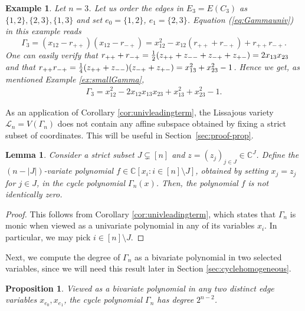 \documentclass[a4paper, 11pt, twoside]{article}
\newcommand{\C}{\mathbb{C}}
\newcommand{\ML}{{\mathcal L}}
\theoremstyle{plain}
\newtheorem{lemma}[theorem]{Lemma}
\newtheorem{proposition}[theorem]{Proposition}
\newtheorem{example}[theorem]{Example}
\begin{document}
\begin{example}\label{ex:Gamma3}
Let $n = 3$. Let us order the edges in $E_3=E(C_3)$ as $\{1,2\},\{2,3\},\{1,3\}$ and set $e_0=\{1,2\}$, $e_1=\{2,3\}$.
Equation (\ref{eq:Gammauniv}) in this example reads
\[
\Gamma_3=(x_{12}-r_{++})(x_{12}-r_{-+})= x_{12}^2-x_{12}(r_{++}+r_{-+})+r_{++}r_{-+}.
\]
One can easily verify that  
 $r_{++}+r_{-+}= {1\over 2}(z_{++}+z_{--}+z_{-+}+z_{+-})=2 x_{13}x_{23}$ and that 
 $r_{++}r_{-+}={1\over 4}(z_{++}+z_{--})(z_{-+}+z_{+-})=  x_{13}^2+x_{23}^2-1$.
 Hence we get,  as mentioned Example \ref{ex:smallGamma},
    \begin{align*}
   \Gamma_3= x_{12}^2 -2 x_{12}x_{13}x_{23}+ x_{13}^2+x_{23}^2-1.
  \end{align*}
\end{example}

As an application of Corollary \ref{cor:univleadingterm}, the Lissajous variety $\ML_n=V(\Gamma_n)$ does not contain any   affine subspace obtained by fixing a strict subset of coordinates. 
This will be useful in Section~\ref{sec:proof-prop}.

\begin{lemma} \label{lem:specializeGamma}
Consider a strict subset $J \subsetneq [n]$ and $z=(z_j)_{j\in J}\in\C^J$.
Define the $(n-|J|)$-variate polynomial $f\in \C[x_i: i\in [n]\setminus J]$, obtained by setting $x_j=z_j$ for $j\in J$, in the cycle polynomial $\Gamma_n(x)$. Then, the polynomial $f$  is not identically zero.
\end{lemma}
\begin{proof}
This follows from Corollary \ref{cor:univleadingterm}, which states that $\Gamma_n$ is monic when viewed as a univariate polynomial in any of its variables $x_i$. In particular, we may pick $i\in [n]\setminus J$.\end{proof}


Next, we compute the degree of $\Gamma_n$ as a bivariate polynomial in two selected variables, since we will need this result later in Section \ref{sec:cyclehomogeneous}.

\begin{proposition} \label{prop:bivariatedegree}
    Viewed as a bivariate polynomial in any two distinct  edge variables $x_{e_0}, x_{e_1}$, the cycle polynomial $\Gamma_n$ has degree $2^{n-2}$. 
\end{proposition}
\end{document}
